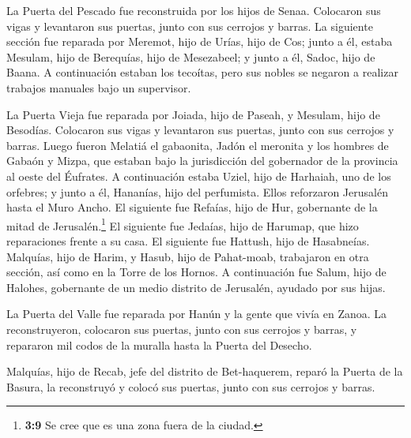  La Puerta del Pescado fue reconstruida por los hijos de
Senaa. Colocaron sus vigas y levantaron sus puertas, junto con sus
cerrojos y barras.  La siguiente sección fue reparada por
Meremot, hijo de Urías, hijo de Cos; junto a él, estaba Mesulam, hijo de
Berequías, hijo de Mesezabeel; y junto a él, Sadoc, hijo de Baana.
 A continuación estaban los tecoítas, pero sus nobles se
negaron a realizar trabajos manuales bajo un supervisor.

 La Puerta Vieja fue reparada por Joiada, hijo de Paseah,
y Mesulam, hijo de Besodías. Colocaron sus vigas y levantaron sus
puertas, junto con sus cerrojos y barras.  Luego fueron
Melatiá el gabaonita, Jadón el meronita y los hombres de Gabaón y Mizpa,
que estaban bajo la jurisdicción del gobernador de la provincia al oeste
del Éufrates.  A continuación estaba Uziel, hijo de
Harhaiah, uno de los orfebres; y junto a él, Hananías, hijo del
perfumista. Ellos reforzaron Jerusalén hasta el Muro Ancho.
 El siguiente fue Refaías, hijo de Hur, gobernante de la
mitad de Jerusalén.\footnote{\textbf{3:9} Se cree que es una zona fuera
  de la ciudad.}  El siguiente fue Jedaías, hijo de
Harumap, que hizo reparaciones frente a su casa. El siguiente fue
Hattush, hijo de Hasabneías.  Malquías, hijo de Harim, y
Hasub, hijo de Pahat-moab, trabajaron en otra sección, así como en la
Torre de los Hornos.  A continuación fue Salum, hijo de
Halohes, gobernante de un medio distrito de Jerusalén, ayudado por sus
hijas.

 La Puerta del Valle fue reparada por Hanún y la gente
que vivía en Zanoa. La reconstruyeron, colocaron sus puertas, junto con
sus cerrojos y barras, y repararon mil codos de la muralla hasta la
Puerta del Desecho.

 Malquías, hijo de Recab, jefe del distrito de
Bet-haquerem, reparó la Puerta de la Basura, la reconstruyó y colocó sus
puertas, junto con sus cerrojos y barras.

